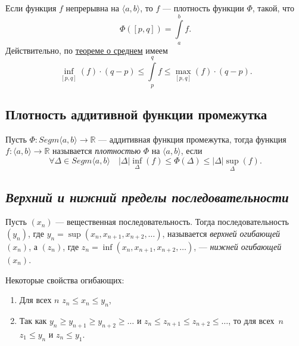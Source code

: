 \begin{example}
	Если функция \(f\) непрерывна на \(\langle a, b \rangle\), то \(f\) --- плотность функции \(\Phi\), такой, что \[
		\Phi([p, q]) = \int\limits_a^b f.
	\]
	Действительно, по \hyperlink{sredneye}{теореме о среднем} имеем\[
		\inf_{[p, q]} (f) \cdot (q - p) \leqslant \int\limits_p^q f \leqslant \max_{[p, q]} (f) \cdot (q - p).
	\]
\end{example}

\subsection{Плотность аддитивной функции промежутка}

\begin{definition}
	Пусть \(\Phi \colon Segm \langle a, b \rangle \to \mathbb{R}\) --- аддитивная функция промежутка, тогда функция \(f: \langle a, b \rangle \to \mathbb{R}\) называется \textit{плотностью} \(\Phi\) на \(\langle a, b \rangle\), если \[
	\forall \Delta \in Segm \langle a, b \rangle \quad |\Delta| \inf_\Delta(f) \leqslant \Phi(\Delta) \leqslant |\Delta| \sup_\Delta(f).
	\]
	
\end{definition}

\subsection{\itshape Верхний и нижний пределы последовательности}

\begin{definition}
	Пусть \((x_n)\) --- вещественная последовательность. Тогда последовательность \((y_n)\), где \(y_n = \sup (x_n, x_{n + 1}, x_{n + 2}, \ldots)\), называется \textit{верхней огибающей} \((x_n)\), а \((z_n)\), где \(z_n = \inf (x_n, x_{n + 1}, x_{n + 2}, \ldots)\), --- \textit{нижней огибающей} \((x_n)\).
\end{definition}

\begin{remark}
	Некоторые свойства огибающих:
	\begin{enumerate}
		\item Для всех \(n\) \(z_n \leqslant x_n \leqslant y_n\),
		\item Так как \(y_n \geqslant y_{n + 1} \geqslant y_{n + 2} \geqslant \ldots\) и \(z_n \leqslant z_{n + 1} \leqslant z_{n + 2} \leqslant \ldots\), то для всех~\(n\) \(z_1 \leqslant y_n\) и \(z_n \leqslant y_1\).
	\end{enumerate}
\end{remark}

